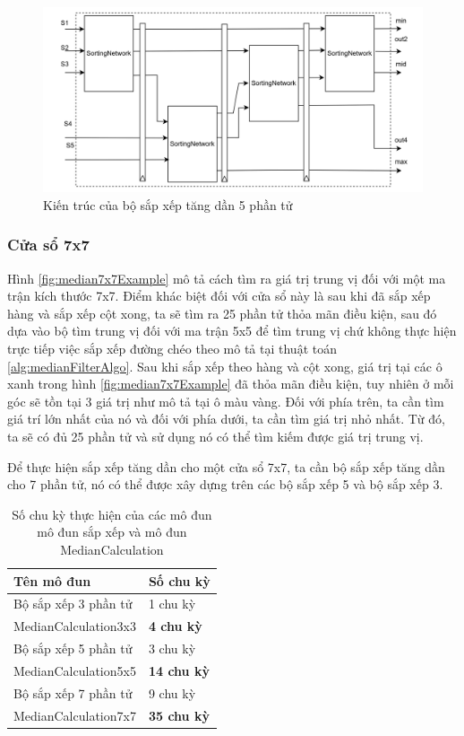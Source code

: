 \begin{figure}[!ht]
	\centering
	\includegraphics[width=\linewidth]{figures/sortAscending5x5RTL.png}
	\caption{Kiến trúc của bộ sắp xếp tăng dần 5 phần tử}
	\label{fig:sortAscending5x5RTL}
\end{figure}

\subsubsection{Cửa sổ 7x7}

Hình \ref{fig:median7x7Example} mô tả cách tìm ra giá trị trung vị đối với một ma trận kích thước 7x7. Điểm khác biệt đối với cửa sổ này là sau khi đã sắp xếp hàng và sắp xếp cột xong, ta sẽ tìm ra 25 phần tử thỏa mãn điều kiện, sau đó dựa vào bộ tìm trung vị đối với ma trận 5x5 để tìm trung vị chứ không thực hiện trực tiếp việc sắp xếp đường chéo theo mô tả tại thuật toán \ref{alg:medianFilterAlgo}. Sau khi sắp xếp theo hàng và cột xong, giá trị tại các ô xanh trong hình \ref{fig:median7x7Example} đã thỏa mãn điều kiện, tuy nhiên ở mỗi góc sẽ tồn tại 3 giá trị như mô tả tại ô màu vàng. Đối với phía trên, ta cần tìm giá trí lớn nhất của nó và đối với phía dưới, ta cần tìm giá trị nhỏ nhất. Từ đó, ta sẽ có đủ 25 phần tử và sử dụng nó có thể tìm kiếm được giá trị trung vị.

Để thực hiện sắp xếp tăng dần cho một cửa sổ 7x7, ta cần bộ sắp xếp tăng dần cho 7 phần tử, nó có thể được xây dựng trên các bộ sắp xếp 5 và bộ sắp xếp 3.


\begin{table}[H]
	\centering
	\renewcommand{\arraystretch}{1.3}
	\begin{tabular}{|p{5cm} p{5cm} |}
		\hline
		\rowcolor{gray!30}
		\textbf{Tên mô đun} & \textbf{Số chu kỳ}
		\\ \hline
		Bộ sắp xếp 3 phần tử & 1 chu kỳ
		  \\
		\hline
		MedianCalculation3x3  & \textbf{4 chu kỳ}
		\\ \hline
		Bộ sắp xếp 5 phần tử & 3 chu kỳ
		\\ \hline
		MedianCalculation5x5 & \textbf{14 chu kỳ}
			\\ \hline
		Bộ sắp xếp 7 phần tử & 9 chu kỳ
		\\ \hline
		MedianCalculation7x7 & \textbf{35 chu kỳ}
		\\ \hline
	\end{tabular}
	\caption{Số chu kỳ thực hiện của các mô đun mô đun sắp xếp và mô đun MedianCalculation}
	\label{tab:numberOfCycleMedianCalculation}
\end{table}

